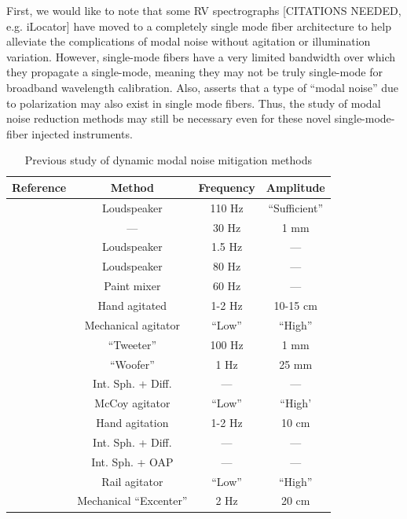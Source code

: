\documentclass[twocolumn]{emulateapj}
\begin{document}
First, we would like to note that some RV spectrographs [CITATIONS NEEDED, e.g. iLocator] have moved to a completely single mode fiber architecture to help alleviate the complications of modal noise without agitation or illumination variation. However, single-mode fibers have a very limited bandwidth over which they propagate a single-mode, meaning they may not be truly single-mode for broadband wavelength calibration. Also, \cite{Halverson2015b} asserts that a type of ``modal noise'' due to polarization may also exist in single mode fibers. Thus, the study of modal noise reduction methods may still be necessary even for these novel single-mode-fiber injected instruments.

\begin{table}
\centering
\caption{Previous study of dynamic modal noise mitigation methods}
	\begin{tabular}{cccc}
		\hline
		Reference & Method & Frequency & Amplitude \\
		\hline\hline
		\cite{Daino1980} & Loudspeaker & 110 Hz & ``Sufficient'' \\
		\hline
		\cite{Baudrand2001} & --- & 30 Hz & 1 mm \\
		\hline
		\multirow{2}{*}{\cite{Lemke2011}} & Loudspeaker & 1.5 Hz & --- \\
		 & Loudspeaker & 80 Hz & --- \\
		\hline
		\multirow{3}{*}{\cite{McCoy2012}} & Paint mixer & 60 Hz & --- \\
		 & Hand agitated & 1-2 Hz & 10-15 cm \\
		 & Mechanical agitator & ``Low'' & ``High''\\
		\hline
		\multirow{2}{*}{\cite{Plavchan2013}} & ``Tweeter'' & 100 Hz & 1 mm \\
		 & ``Woofer'' & 1 Hz & 25 mm \\
		\hline
		\multirow{3}{*}{\cite{Mahadevan2014}} & Int. Sph. + Diff. & --- & ---\\
		 & McCoy agitator & ``Low'' & ``High' \\
		 & Hand agitation & 1-2 Hz & 10 cm \\
		\hline
		\multirow{2}{*}{\cite{Halverson2014}} & Int. Sph. + Diff. & --- & --- \\
		 & Int. Sph. + OAP & --- & --- \\
		\hline		
		\cite{Roy2014} & Rail agitator & ``Low'' & ``High'' \\
		\hline
		\cite{Sablowski2015} & Mechanical ``Excenter''& 2 Hz & 20 cm \\
		\hline
	\end{tabular}
\label{table:previous_studies}
\end{table}
\end{document}
